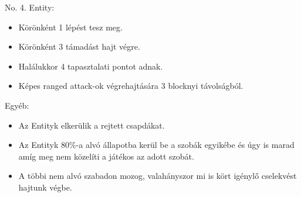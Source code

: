 \noindent No. 4. Entity:
\begin{itemize}
    \item Körönként 1 lépést tesz meg.
    \item Körönként 3 támadást hajt végre.
    \item Halálukkor 4 tapasztalati pontot adnak.
    \item Képes ranged attack-ok végrehajtására 3 blocknyi távolságból.
\end{itemize}

\noindent Egyéb:
\begin{itemize}
    \item Az Entityk elkerülik a rejtett csapdákat.
    \item Az Entityk 80\%-a alvó állapotba kerül be a szobák egyikébe és úgy is marad amíg meg nem közelíti a játékos az adott szobát.
    \item A többi nem alvó szabadon mozog, valahányszor mi is kört igénylő cselekvést hajtunk végbe.
\end{itemize}
\newpage
{}

